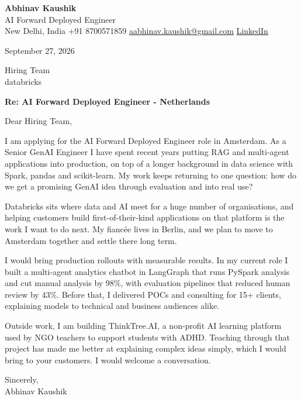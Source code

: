 \documentclass[11pt,a4paper]{article}
\begin{document}
{\Large\bfseries Abhinav Kaushik}\\
AI Forward Deployed Engineer\\
New Delhi, India \textbar{} +91 8700571859 \textbar{} \href{mailto:aabhinav.kaushik@gmail.com}{aabhinav.kaushik@gmail.com} \textbar{} \href{https://www.linkedin.com/in/abhinav-kaushik10/}{LinkedIn}  

September 27, 2026

Hiring Team\\
databricks

\textbf{Re: AI Forward Deployed Engineer - Netherlands}

Dear Hiring Team,

I am applying for the AI Forward Deployed Engineer role in Amsterdam. As a Senior GenAI Engineer I have spent recent years putting RAG and multi-agent applications into production, on top of a longer background in data science with Spark, pandas and scikit-learn. My work keeps returning to one question: how do we get a promising GenAI idea through evaluation and into real use?

Databricks sits where data and AI meet for a huge number of organisations, and helping customers build first-of-their-kind applications on that platform is the work I want to do next. My fiancée lives in Berlin, and we plan to move to Amsterdam together and settle there long term.

I would bring production rollouts with measurable results. In my current role I built a multi-agent analytics chatbot in LangGraph that runs PySpark analysis and cut manual analysis by 98\%, with evaluation pipelines that reduced human review by 43\%. Before that, I delivered POCs and consulting for 15+ clients, explaining models to technical and business audiences alike.

Outside work, I am building ThinkTree.AI, a non-profit AI learning platform used by NGO teachers to support students with ADHD. Teaching through that project has made me better at explaining complex ideas simply, which I would bring to your customers. I would welcome a conversation.

Sincerely,\\[4pt]
Abhinav Kaushik
\end{document}
